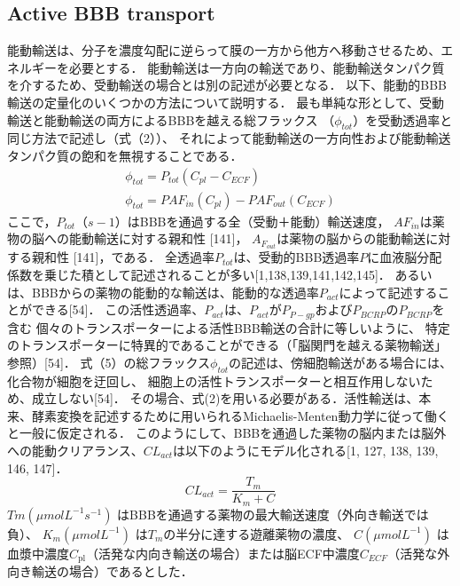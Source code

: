 \documentclass[11pt,a4paper]{jsarticle}
\begin{document}
\subsection{Active BBB transport}
能動輸送は、分子を濃度勾配に逆らって膜の一方から他方へ移動させるため、エネルギーを必要とする．
能動輸送は一方向の輸送であり、能動輸送タンパク質を介するため、受動輸送の場合とは別の記述が必要となる．
以下、能動的BBB輸送の定量化のいくつかの方法について説明する．
最も単純な形として、受動輸送と能動輸送の両方によるBBBを越える総フラックス
（$\phi_{tot}$）を受動透過率と同じ方法で記述し（式（2））、
それによって能動輸送の一方向性および能動輸送タンパク質の飽和を無視することである．
\begin{align*}
    \phi_{tot}=P_{tot}(C_{pl}-C_{ECF}) \\
    \phi_{tot}=PAF_{in}(C_{pl})-PAF_{out}(C_{ECF})
\end{align*}
ここで，$P_{tot}（s-1）$はBBBを通過する全（受動＋能動）輸送速度，
$AF_{in}$は薬物の脳への能動輸送に対する親和性 [141]，
$A_{F_{out}}$は薬物の脳からの能動輸送に対する親和性 [141]，である．
全透過率$P_{tot}$は、受動的BBB透過率$P$に血液脳分配係数を乗じた積として記述されることが多い[1,138,139,141,142,145]．
あるいは、BBBからの薬物の能動的な輸送は、能動的な透過率$P_{act}$によって記述することができる[54]．
この活性透過率、$P_{act}$は、$P_{act}$が$P_{P-gp}$および$P_{BCRP}$の$P_{BCRP}$を含む
個々のトランスポーターによる活性BBB輸送の合計に等しいように、
特定のトランスポーターに特異的であることができる（「脳関門を越える薬物輸送」参照）[54]．
式（5）の総フラックス$\phi_{tot}$の記述は、傍細胞輸送がある場合には、化合物が細胞を迂回し、
細胞上の活性トランスポーターと相互作用しないため、成立しない[54]．
その場合、式(2)を用いる必要がある．活性輸送は、本来、酵素変換を記述するために用いられるMichaelis-Menten動力学に従って働くと一般に仮定される．
このようにして、BBBを通過した薬物の脳内または脳外への能動クリアランス、$CL_{act}$は以下のようにモデル化される[1, 127, 138, 139, 146, 147]．
\begin{equation}
    CL_{act}=\frac{T_m}{K_m+C}
\end{equation}
$Tm(\mu mol L^{-1}s^{-1})$ はBBBを通過する薬物の最大輸送速度（外向き輸送では負）、
$K_m (\mu mol L^{-1})$ は$T_m$の半分に達する遊離薬物の濃度、
$C(μmol L^{-1})$ は血漿中濃度$C_{\mathrm{pl}}$（活発な内向き輸送の場合）または脳ECF中濃度$C_{ECF}$（活発な外向き輸送の場合）であるとした．
\end{document}
